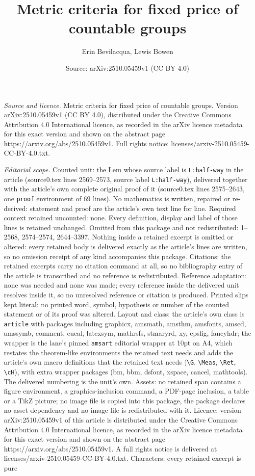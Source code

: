 \documentclass[10pt,a4paper]{amsart}
\title[Metric criteria for fixed price of countable groups]{Metric criteria for fixed price of countable groups}
\author{Erin Bevilacqua, Lewis Bowen}
\date{Source: arXiv:2510.05459v1 (CC BY 4.0)}
\begin{document}
\maketitle

\noindent\emph{Source and licence.} Metric criteria for fixed price of countable groups. Version arXiv:2510.05459v1 (CC BY 4.0), distributed under the Creative Commons Attribution 4.0 International licence, as recorded in the arXiv licence metadata for this exact version and shown on the abstract page https://arxiv.org/abs/2510.05459v1. Full rights notice: licenses/arxiv-2510.05459-CC-BY-4.0.txt.\par\smallskip

\noindent\textit{Editorial scope.} Counted unit: the Lem whose source label is \texttt{L:half-way} in the article (source0.tex lines 2569--2573, source label \texttt{L:half-way}), delivered together with the article's own complete original proof of it (source0.tex lines 2575--2643, one \texttt{proof} environment of 69 lines). No mathematics is written, repaired or re-derived: statement and proof are the article's own text line for line. Required context retained uncounted: none. Every definition, display and label of those lines is retained unchanged. Omitted from this package and not redistributed: 1--2568, 2574--2574, 2644--3397. Nothing inside a retained excerpt is omitted or altered: every retained body is delivered exactly as the article's lines are written, so no omission receipt of any kind accompanies this package. Citations: the retained excerpts carry no citation command at all, so no bibliography entry of the article is transcribed and no reference is redistributed. Reference adaptation: none was needed and none was made; every reference inside the delivered unit resolves inside it, so no unresolved reference or citation is produced. Printed slips kept literal: no printed word, symbol, hypothesis or number of the counted statement or of its proof was altered. Layout and class: the article's own class is \texttt{article} with packages including graphicx, amsmath, amsthm, amsfonts, amscd, amssymb, comment, eucal, latexsym, mathrsfs, stmaryrd, xy, epsfig, fancyhdr; the wrapper is the lane's pinned \texttt{amsart} editorial wrapper at 10pt on A4, which restates the theorem-like environments the retained text needs and adds the article's own macro definitions that the retained text needs (\texttt{\textbackslash G}, \texttt{\textbackslash Meas}, \texttt{\textbackslash Ret}, \texttt{\textbackslash cH}), with extra wrapper packages (bm, bbm, dsfont, xspace, cancel, mathtools). The delivered numbering is the unit's own. Assets: no retained span contains a figure environment, a graphics-inclusion command, a PDF-page inclusion, a table or a TikZ picture; no image file is copied into this package, the package declares no asset dependency and no image file is redistributed with it. Licence: version arXiv:2510.05459v1 of this article is distributed under the Creative Commons Attribution 4.0 International licence, as recorded in the arXiv licence metadata for this exact version and shown on the abstract page https://arxiv.org/abs/2510.05459v1. A full rights notice is delivered at licenses/arxiv-2510.05459-CC-BY-4.0.txt. Characters: every retained excerpt is pure 
\end{document}
